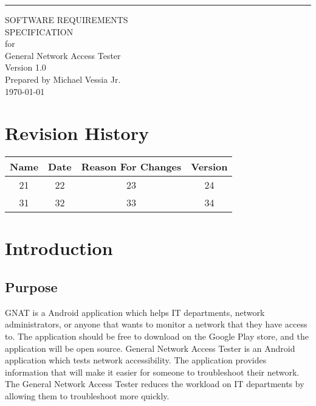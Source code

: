 \documentclass{scrreprt}
\date{}
\def\myversion{1.0 }
\def\author{Michael Vessia Jr.}
\begin{document}
\begin{flushright}
  \rule{16cm}{5pt}\vskip1cm
  \begin{bfseries}
    \Huge{SOFTWARE REQUIREMENTS\\ SPECIFICATION}\\
    \vspace{1.9cm}
    for\\
    \vspace{1.9cm}
    General Network Access Tester\\
    \vspace{1.9cm}
    \LARGE{Version \myversion}\\
    \vspace{1.9cm}
    Prepared by \author\\
    \vspace{1.9cm}
    \today\\
  \end{bfseries}
\end{flushright}

\tableofcontents


\chapter*{Revision History}

\begin{center}
  \begin{tabular}{|c|c|c|c|}
    \hline
    Name & Date & Reason For Changes & Version\\
    \hline
    21 & 22 & 23 & 24\\
    \hline
    31 & 32 & 33 & 34\\
    \hline
  \end{tabular}
\end{center}

\chapter{Introduction}

\section{Purpose}

GNAT is a Android application which helps IT departments, network administrators, or anyone that wants to monitor a network that they have access to. The application should be free to download on the Google Play store, and the application will be open source. General Network Access Tester is an Android application which tests network accessibility.  The application provides information that will make it easier for someone to troubleshoot their network.  The General Network Access Tester  reduces the workload on IT departments by allowing them to troubleshoot more quickly.
\end{document}
